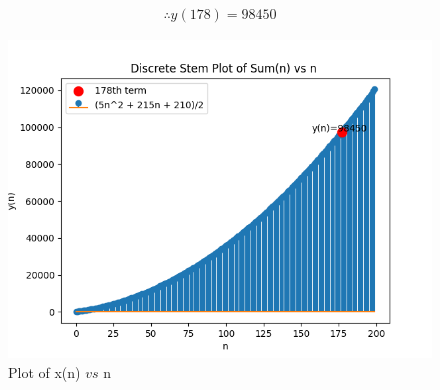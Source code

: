 \documentclass[journal,12pt,twocolumn]{IEEEtran}
\theoremstyle{remark}
\begin{document}
\begin{align}
    \therefore y(178)=98450
\end{align}
\begin{figure}[ht]
    \centering
    \includegraphics[width=\columnwidth]{Figures/fig1.png}
    \caption{Plot of x(n) $vs$ n}
    \label{fig: 10.5.3.12}
\end{figure}
\end{document}
